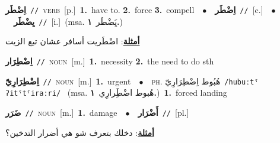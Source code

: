 \documentclass[10pt,a4paper,twoside]{article} %
\begin{document}
\begin{multicols}{2}
{\setlength\topsep{0pt}\textbf{\foreignlanguage{arabic}{اِضْطَر}}\ {\color{gray}\texttt{//}\color{black}}\ \textsc{verb}\ [p.]\ \textbf{1.}~have to.  \textbf{2.}~force  \textbf{3.}~compell\ \ $\bullet$\ \ \setlength\topsep{0pt}\textbf{\foreignlanguage{arabic}{اِضْطَر}}\ {\color{gray}\texttt{//}\color{black}}\ [c.]\ \ $\bullet$\ \ \setlength\topsep{0pt}\textbf{\foreignlanguage{arabic}{يِضْطَر}}\ {\color{gray}\texttt{//}\color{black}}\ [i.]\ \color{gray}(msa. \foreignlanguage{arabic}{يَِضْطَر}~\foreignlanguage{arabic}{\textbf{١.}})\color{black}\  \begin{flushright}\color{gray}\foreignlanguage{arabic}{\textbf{\underline{\foreignlanguage{arabic}{أمثلة}}}: اضْطَريت أسافر عشان تبع الزيت}\end{flushright}\color{black}} \vspace{2mm}

{\setlength\topsep{0pt}\textbf{\foreignlanguage{arabic}{اِضْطِرَار}}\ {\color{gray}\texttt{//}\color{black}}\ \textsc{noun}\ [m.]\ \textbf{1.}~necessity  \textbf{2.}~the need to do sth\ } \vspace{2mm}

{\setlength\topsep{0pt}\textbf{\foreignlanguage{arabic}{اِضْطِرَارِيّ}}\ {\color{gray}\texttt{//}\color{black}}\ \textsc{noun}\ [m.]\ \textbf{1.}~urgent\ \ $\bullet$\ \ \textsc{ph.} \color{gray} \foreignlanguage{arabic}{هُبُوط اِضْطِرَارِيّ}\color{black}\ {\color{gray}\texttt{/{\sffamily hubuːtˤ ʔitˤtˤiraːri}/}\color{black}}\ \color{gray} (msa. \foreignlanguage{arabic}{هُبوط اضْطَِرارِي}~\foreignlanguage{arabic}{\textbf{١.}})\color{black}\ \textbf{1.}~forced landing\ } \vspace{2mm}

{\setlength\topsep{0pt}\textbf{\foreignlanguage{arabic}{ضَرَر}}\ {\color{gray}\texttt{//}\color{black}}\ \textsc{noun}\ [m.]\ \textbf{1.}~damage\ \ $\bullet$\ \ \setlength\topsep{0pt}\textbf{\foreignlanguage{arabic}{أَضْرَار}}\ {\color{gray}\texttt{//}\color{black}}\ [pl.]\  \begin{flushright}\color{gray}\foreignlanguage{arabic}{\textbf{\underline{\foreignlanguage{arabic}{أمثلة}}}: دخلك بتعرف شو هي أضرار التدخين؟}\end{flushright}\color{black}} \vspace{2mm}


\end{multicols}
\end{document}
